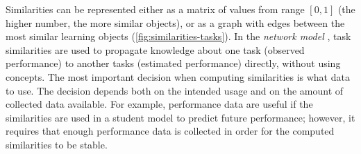Similarities can be represented either as a matrix of values from range $[0, 1]$
(the higher number, the more similar objects),
or as a graph with edges between the most similar learning objects
(\cref{fig:similarities-tasks}).
In the \emph{network model} \cite{rihak-phd}, task similarities are used to propagate
knowledge about one task (observed performance) to another tasks (estimated performance)
directly, without using concepts.
The most important decision when computing similarities is what data to use.
The decision depends both on the intended usage and on the amount of collected data
available. For example, performance data are useful if the similarities are used in a
student model to predict future performance; however, it requires that enough
performance data is collected in order for the computed similarities to be stable.

